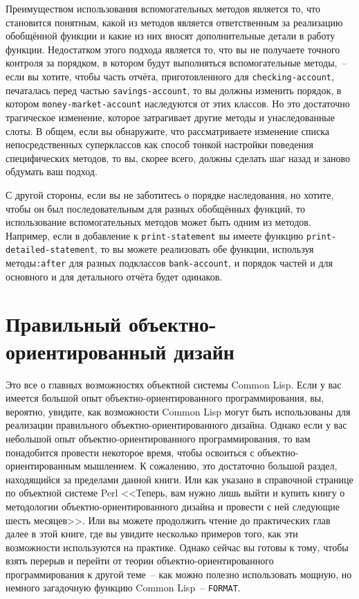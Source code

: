Преимуществом использования вспомогательных методов является то, что становится понятным,
какой из методов является ответственным за реализацию обобщённой функции и какие из них
вносят дополнительные детали в работу функции.  Недостатком этого подхода является то, что
вы не получаете точного контроля за порядком, в котором будут выполняться вспомогательные
методы,~-- если вы хотите, чтобы часть отчёта, приготовленного для \lstinline{checking-account},
печаталась перед частью \lstinline{savings-account}, то вы должны изменить порядок, в котором
\lstinline{money-market-account} наследуются от этих классов.  Но это достаточно трагическое
изменение, которое затрагивает другие методы и унаследованные слоты.  В общем, если вы
обнаружите, что рассматриваете изменение списка непосредственных суперклассов как способ
тонкой настройки поведения специфических методов, то вы, скорее всего, должны сделать шаг
назад и заново обдумать ваш подход.

С другой стороны, если вы не заботитесь о порядке наследования, но хотите, чтобы он был
последовательным для разных обобщённых функций, то использование вспомогательных методов
может быть одним из методов.  Например, если в добавление к \lstinline{print-statement} вы
имеете функцию \lstinline{print-detailed-statement}, то вы можете реализовать обе функции,
используя методы\lstinline{:after} для разных подклассов \lstinline{bank-account}, и порядок частей
и для основного и для  детального отчёта будет одинаков.


\section{Правильный объектно-ориентированный дизайн}

Это все о главных возможностях объектной системы Common Lisp.  Если у вас имеется большой
опыт объектно-ориентированного программирования, вы, вероятно, увидите, как возможности
Common Lisp могут быть использованы для реализации правильного объектно-ориентированного
дизайна.  Однако если у вас небольшой опыт объектно-ориентированного программирования, то
вам понадобится провести некоторое время, чтобы освоиться с объектно-ориентированным
мышлением.  К сожалению, это достаточно большой раздел, находящийся за пределами данной
книги.  Или как указано в справочной странице по объектной системе Perl <<Теперь, вам
нужно лишь выйти и купить книгу о методологии объектно-ориентированного дизайна и
провести с ней следующие шесть месяцев>>.  Или вы можете продолжить чтение до практических
глав далее в этой книге, где вы увидите несколько примеров того, как эти возможности
используются на практике.  Однако сейчас вы готовы к тому, чтобы взять перерыв и перейти
от теории объектно-ориентированного программирования к другой теме~-- как можно полезно
использовать мощную, но немного загадочную функцию Common Lisp~-- \lstinline{FORMAT}.


